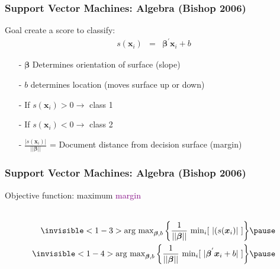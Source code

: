 \documentclass{beamer}
\numberwithin{equation}{section}
\begin{document}
\begin{frame}
\frametitle{Support Vector Machines: Algebra (Bishop 2006) } 

Goal create a score to classify: 
\begin{eqnarray}
s(\boldsymbol{x}_i) & = & \boldsymbol{\beta}^{'} \boldsymbol{x}_i + b \nonumber 
\end{eqnarray} 



\begin{itemize}
\item[-] $\boldsymbol{\beta} $ Determines orientation of surface (slope) 
\item[-] $b$ determines location (moves surface up or down)
\item[-] If $s(\boldsymbol{x}_i) > 0 \rightarrow $ class 1
\item[-] If $s(\boldsymbol{x}_i ) < 0 \rightarrow $ class 2 
\item[-] $\frac{| s(\boldsymbol{x}_i) | } {|| \boldsymbol{\beta} || } $ = Document distance from decision surface  (margin) 
\end{itemize}


\end{frame}


\begin{frame}
\frametitle{Support Vector Machines: Algebra (Bishop 2006) } 

Objective function: \alert{maximum} \textcolor{purple}{margin} \pause \\
 \pause \\
 \pause

\begin{eqnarray}
\invisible<1-3>{\text{arg max}_{\boldsymbol{\beta}, b }  \left\{ \frac{1}{||\boldsymbol{\beta} || } \text{ min}_{i} [\text{   } | (s(\boldsymbol{x}_i) |\text{   } ] \right\} \nonumber } \pause \\
\invisible<1-4>{\text{arg max}_{\boldsymbol{\beta}, b }  \left\{ \frac{1}{||\boldsymbol{\beta} || } \text{ min}_{i} [\text{   } | \boldsymbol{\beta}^{'} \boldsymbol{x}_i + b |\text{   } ] \right\} \nonumber  } \pause
\end{eqnarray}


\end{frame}
\end{document}

